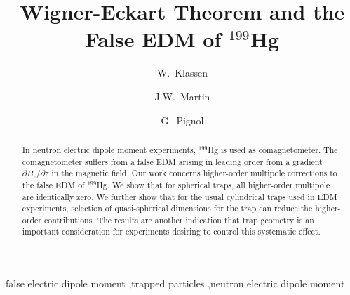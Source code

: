 \documentclass[preprint,12pt]{elsarticle}
\begin{document}
\begin{frontmatter}


\title{Wigner-Eckart Theorem and the False EDM of $^{199}$Hg}




\author[um]{W.~Klassen}
\author[uw,um]{J.W.~Martin}
\author[lspc]{G.~Pignol}

\address[um]{Physics and Astronomy, University of Manitoba, Winnipeg, MB, Canada}
\address[uw]{Department of Physics, The University of Winnipeg, Winnipeg, MB, Canada}
\address[lspc]{Universit\'e Grenoble Alpes, CNRS, Grenoble INP, LPSC-IN2P3, Grenoble, France}

\begin{abstract}
  In neutron electric dipole moment experiments, $^{199}$Hg is used as
  comagnetometer.  The comagnetometer suffers from a false EDM arising
  in leading order from a gradient $\partial B_{z}/\partial z$ in the
  magnetic field.  Our work concerns higher-order multipole
  corrections to the false EDM of $^{199}$Hg.  We show that for
  spherical traps, all higher-order multipole are identically zero.
  We further show that for the usual cylindrical traps used in EDM
  experiments, selection of quasi-spherical dimensions for the trap
  can reduce the higher-order contributions.  The results are another
  indication that trap geometry is an important consideration for
  experiments desiring to control this systematic effect.
\end{abstract}

\begin{keyword}
false electric dipole moment \sep trapped particles \sep neutron electric dipole moment


\end{keyword}

\end{frontmatter}
\end{document}
